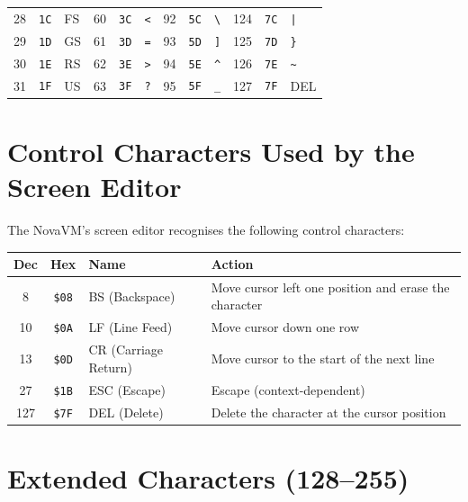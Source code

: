 \begin{center}
\begin{longtable}{@{}rrl@{\qquad}rrl@{\qquad}rrl@{\qquad}rrl@{}}
28 & \texttt{1C} & FS  &  60 & \texttt{3C} & \texttt{<} &  92 & \texttt{5C} & \texttt{\textbackslash} & 124 & \texttt{7C} & \texttt{|} \\
29 & \texttt{1D} & GS  &  61 & \texttt{3D} & \texttt{=} &  93 & \texttt{5D} & \texttt{]} & 125 & \texttt{7D} & \texttt{\}} \\
30 & \texttt{1E} & RS  &  62 & \texttt{3E} & \texttt{>} &  94 & \texttt{5E} & \texttt{\^{}} & 126 & \texttt{7E} & \texttt{\~{}} \\
31 & \texttt{1F} & US  &  63 & \texttt{3F} & \texttt{?} &  95 & \texttt{5F} & \texttt{\_} & 127 & \texttt{7F} & DEL \\
\bottomrule
\end{longtable}
\end{center}


\section{Control Characters Used by the Screen Editor}
\label{sec:control-chars}

The NovaVM's screen editor recognises the following control characters:

\begin{center}
\small
\begin{tabular}{@{}ccll@{}}
\toprule
\textbf{Dec} & \textbf{Hex} & \textbf{Name} & \textbf{Action} \\
\midrule
 8 & \texttt{\$08} & BS (Backspace) & Move cursor left one position and erase the character \\
10 & \texttt{\$0A} & LF (Line Feed) & Move cursor down one row \\
13 & \texttt{\$0D} & CR (Carriage Return) & Move cursor to the start of the next line \\
27 & \texttt{\$1B} & ESC (Escape) & Escape (context-dependent) \\
127 & \texttt{\$7F} & DEL (Delete) & Delete the character at the cursor position \\
\bottomrule
\end{tabular}
\end{center}


\section{Extended Characters (128--255)}
\label{sec:extended-chars}

